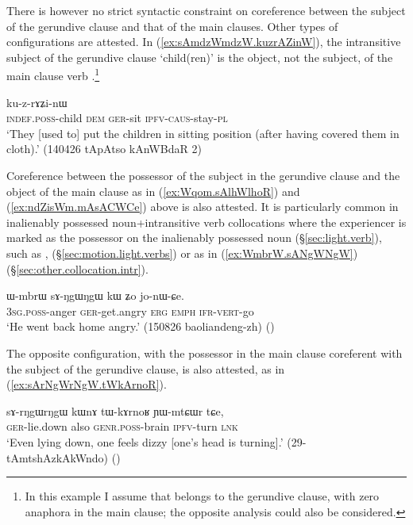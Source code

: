 There is however no strict syntactic constraint on coreference between the subject of the gerundive clause and that of the main clauses. Other types of configurations are attested. In (\ref{ex:sAmdzWmdzW.kuzrAZinW}), the intransitive subject of the gerundive clause  `child(ren)' is the object, not the subject, of the main clause verb .\footnote{In this example I assume that  belongs to the gerundive clause, with zero anaphora in the main clause; the opposite analysis could also be considered.}

\begin{exe}
\ex \label{ex:sAmdzWmdzW.kuzrAZinW}
 ku-z-rɤʑi-nɯ \\
\textsc{indef}.\textsc{poss}-child \textsc{dem} \textsc{ger}-sit \textsc{ipfv}-\textsc{caus}-stay-\textsc{pl} \\
\glt `They [used to] put the children in sitting position (after having covered them in cloth).' (140426 tApAtso kAnWBdaR 2)
\end{exe}

Coreference between the possessor of the subject in the gerundive clause and the object of the main clause as in (\ref{ex:Wqom.sAlhWlhoR}) and (\ref{ex:ndZisWm.mAsACWCe}) above is also attested. It is particularly common in inalienably possessed noun+intransitive verb collocations where the experiencer is marked as the possessor on the inalienably possessed noun (§\ref{sec:light.verb}), such as ,  (§\ref{sec:motion.light.verbs}) or  as in (\ref{ex:WmbrW.sANgWNgW}) (§\ref{sec:other.collocation.intr}).

\begin{exe}
\ex \label{ex:WmbrW.sANgWNgW}
\gll ɯ-mbrɯ sɤ-ŋgɯ\redp{}ŋgɯ kɯ ʑo jo-nɯ-ɕe. \\
\textsc{3sg}.\textsc{poss}-anger \textsc{ger}-get.angry \textsc{erg} \textsc{emph} \textsc{ifr}-\textsc{vert}-go \\
\glt `He went back home angry.' (150826 baoliandeng-zh) ()
\end{exe}

The opposite configuration, with the possessor in the main clause coreferent with the subject of the gerundive clause, is also attested, as in (\ref{ex:sArNgWrNgW.tWkArnoR}).

\begin{exe}
\ex \label{ex:sArNgWrNgW.tWkArnoR}
\gll  sɤ-rŋgɯ\redp{}rŋgɯ kɯnɤ tɯ-kɤrnoʁ ɲɯ-mtɕɯr tɕe, \\
\textsc{ger}-lie.down also \textsc{genr}.\textsc{poss}-brain \textsc{ipfv}-turn \textsc{lnk} \\
\glt `Even lying down, one feels dizzy [one's head is turning].' (29-tAmtshAzkAkWndo) ()
\end{exe}

